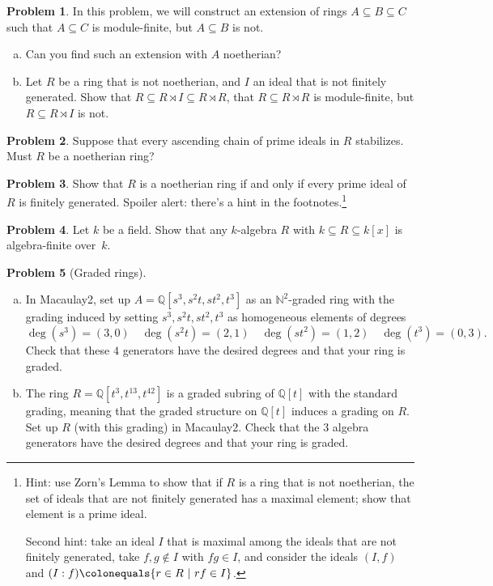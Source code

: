 \documentclass[11pt]{article}
\theoremstyle{definition}
\newtheorem{problem}{Problem}
\begin{document}
\begin{problem}
In this problem, we will construct an extension of rings $A \subseteq B \subseteq C$ such that $A \subseteq C$ is module-finite, but $A \subseteq B$ is not.

\begin{enumerate}[a)]
\item Can you find such an extension with $A$ noetherian?
\item Let $R$ be a ring that is not noetherian, and $I$ an ideal that is not finitely generated. 
Show that ${R \subseteq R \rtimes I \subseteq R \rtimes R}$, that $R \subseteq R \rtimes R$ is module-finite, but  $R \subseteq R \rtimes I$ is not.
\end{enumerate}
\end{problem}




\begin{problem}
	Suppose that every ascending chain of prime ideals in $R$ stabilizes. Must $R$ be a noetherian ring? 
\end{problem}



\begin{problem}
Show that $R$ is a noetherian ring if and only if every prime ideal of $R$ is finitely generated.
Spoiler alert: there's a hint in the footnotes.\footnote{Hint: use Zorn's Lemma to show that if $R$ is a ring that is not noetherian, the set of ideals that are not finitely generated has a maximal element; show that element is a prime ideal.

Second hint: take an ideal $I$ that is maximal among the ideals that are not finitely generated, take $f,g\notin I$ with $fg\in I$, and consider the ideals $(I,f)$ and $(I:f)  \colonequals \{ r\in R \ | \ rf\in I\}$.}
\end{problem}


\begin{problem}
	Let $k$ be a field. Show that any $k$-algebra $R$ with $k \subseteq R \subseteq k[x]$ is algebra-finite over~$k$.
\end{problem}


\begin{problem}[Graded rings]
$\,$
	\begin{enumerate}[a)]
		\item In Macaulay2, set up $A = \mathbb{Q}[s^3,s^2t,st^2,t^3]$ as an $\mathbb{N}^2$-graded ring with the grading induced by setting $s^3, s^2t, st^2, t^3$ as homogeneous elements of degrees
		$$\deg(s^3) = (3,0) \quad \deg(s^2t) = (2,1) \quad \deg(st^2) = (1,2) \quad \deg(t^3) = (0,3).$$
	Check that these $4$ generators have the desired degrees and that your ring is graded.
		\item The ring $R=\mathbb{Q}[t^3,t^{13},t^{42}]$ is a graded subring of $\mathbb{Q}[t]$ with the standard grading, meaning that the graded structure on $\mathbb{Q}[t]$ induces a grading on $R$. Set up $R$ (with this grading) in Macaulay2.
		Check that the $3$ algebra generators have the desired degrees and that your ring is graded.
	\end{enumerate}
\end{problem}
\end{document}
